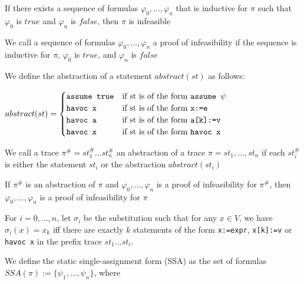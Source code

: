 \documentclass[landscape, a4paper]{article}
\begin{document}
\begin{minipage}[t]{0.2\linewidth}
\begin{betterlist}
		\item If there exists a sequence of formulas $\varphi_0, \ldots , \varphi_n$ that is inductive for $\pi$ such that $\varphi_0$ is $true$ and $\varphi_n$ is $false$, then $\pi$ is infeasible
		\item We call a sequence of formulas $\varphi_0, \ldots , \varphi_n$ a \alert{proof of infeasibility} if the sequence is inductive for $\pi$, $\varphi_0$ is $true$, and $\varphi_n$ is $false$
		\item We define the \alert{abstraction of a statement} $abstract(st)$ as follows:

		$abstract(st) = \begin{cases}
				\verb|assume true| & \text{if st is of the form } \verb|assume |\psi \\
				\verb|havoc x|     & \text{if st is of the form } \verb|x:=e|        \\
				\verb|havoc a|     & \text{if st is of the form } \verb|a[k]:=v|     \\
				\verb|havoc x|     & \text{if st is of the form } \verb|havoc x|
			\end{cases}$
		\item We call a trace $\pi^\# = st^\#_1 \ldots st^\#_n$ an \alert{abstraction of a trace} $\pi = st_1, \ldots, st_n$ if each $st^\#_i$ is either the statement $st_i$ or the abstraction $abstract(st_i)$
		\begin{betterlist}
			\item If $\pi^\#$ is an abstraction of $\pi$ and $\varphi_0, \ldots , \varphi_n$ is a proof of infeasibility for $\pi^\#$, then $\varphi_0, \ldots , \varphi_n$ is a proof of infeasibility for $\pi$
		\end{betterlist}
		\item For $i = 0, \ldots, n$, let $\sigma_i$ be the substitution such that for any $x \in V$, we have $\sigma_i(x) = x_k$ iff there are exactly $k$ statements of the form \verb|x:=expr|, \verb|x[k]:=v| or \verb|havoc x| in the prefix trace $st_1 \ldots st_i$.

		We define the \alert{static single-assignment form (SSA)} as the set of formulas $SSA(\pi) := \{\psi_1, \ldots, \psi_n\}$, where


\end{betterlist}
\end{minipage}
\end{document}
